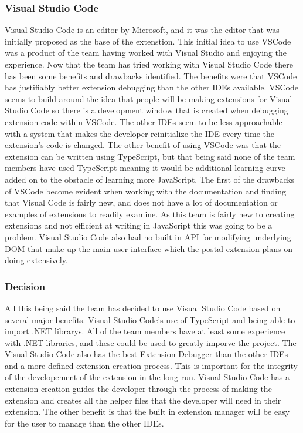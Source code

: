 \documentclass[letterpaper,10pt,titlepage,draftclsnofoot,onecolumn,onesided] {IEEEtran}
\begin{document}
\subsubsection{Visual Studio Code}
Visual Studio Code is an editor by Microsoft, and it was the editor that was initially proposed as the base of the extenstion. \cite{VSCode}
This initial idea to use VSCode was a product of the team having worked with Visual Studio and enjoying the experience. 
Now that the team has tried working with Visual Studio Code there has been some benefits and drawbacks identified. 
The benefits were that VSCode has justifiably better extension debugging than the other IDEs available. 
VSCode seems to build around the idea that people will be making extensions for Visual Studio Code so there is a development window that is created when debugging extension code within VSCode. 
The other IDEs seem to be less approachable with a system that makes the developer reinitialize the IDE every time the extension's code is changed. 
The other benefit of using VSCode was that the extension can be written using TypeScript, but that being said none of the team members have used TypeScript meaning it would be additional learning curve added on to the obstacle of learning more JavaScript. 
The first of the drawbacks of VSCode become evident when working with the documentation and finding that Visual Code is fairly new, and does not have a lot of documentation or examples of extensions to readily examine. 
As this team is fairly new to creating extensions and not efficient at writing in JavaScript this was going to be a problem. 
Visual Studio Code also had no built in API for modifying underlying DOM that make up the main user interface which the postal extension plans on doing extensively.

\subsubsection{Decision}
All this being said the team has decided to use Visual Studio Code based on several major benefits. 
Visual Studio Code's use of TypeScript and being able to import .NET librarys. 
All of the team members have at least some experience with .NET libraries, and these could be used to greatly imporve the project. 
The Visual Studio Code also has the best Extension Debugger than the other IDEs and a more defined extension creation process.
This is important for the integrity of the developement of the extension in the long run. 
Visual Studio Code has a extension creation guides the developer through the process of making the extension and creates all the helper files that the developer will need in their extension.
The other benefit is that the built in extension manager will be easy for the user to manage than the other IDEs. 
\end{document}
